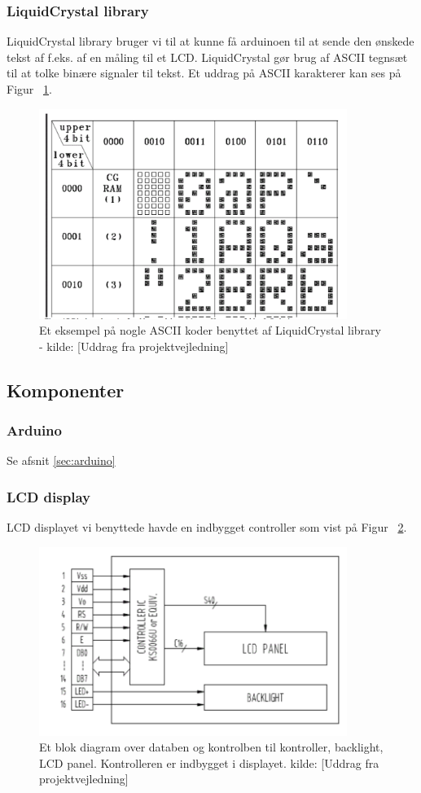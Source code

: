 \subsubsection{LiquidCrystal library}
LiquidCrystal library bruger vi til at kunne få arduinoen til at sende den ønskede tekst af f.eks. af en måling til et LCD. LiquidCrystal gør brug af ASCII tegnsæt til at tolke binære signaler til tekst. Et uddrag på ASCII karakterer kan ses på Figur ~\ref{ASCII}. 
\begin{figure}[H]
	\centering
    \includegraphics[width=10cm]{figures/LCDdesign/ASCII.png}
	\caption{Et eksempel på nogle ASCII koder benyttet af LiquidCrystal library - kilde: [Uddrag fra projektvejledning]}
	\label{ASCII}
\end{figure}
\subsection{Komponenter}
\subsubsection{Arduino}
Se afsnit \ref{sec:arduino} 

\subsubsection{LCD display}
LCD displayet vi benyttede havde en indbygget controller som vist på Figur ~\ref{driver}.
\begin{figure}[H]
	\centering
    \includegraphics[width=10cm]{figures/LCDdesign/displayblokdiagram.png}
	\caption{Et blok diagram over databen og kontrolben til  kontroller, backlight, LCD panel. Kontrolleren er indbygget i displayet. kilde: [Uddrag fra projektvejledning]}
	\label{driver}
\end{figure}


